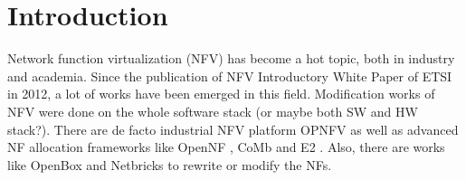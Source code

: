 \documentclass{sig-alternate-10pt}
\begin{document}
%
%



%
%

%
%



\section{Introduction}

Network function virtualization (NFV) has become a hot topic, both in industry and academia. Since the publication of NFV Introductory White Paper \cite{} of ETSI in 2012, a lot of works have been emerged in this field. Modification works of NFV were done on the whole software stack (or maybe both SW and HW stack?). There are de facto industrial NFV platform OPNFV \cite{noauthor_home_nodate} as well as advanced NF allocation frameworks like OpenNF \cite{gember-jacobson_opennf:_2014}, CoMb \cite{180672} and E2 \cite{palkar_e2:_2015}. Also, there are works like OpenBox \cite{bremler-barr_openbox:_2016} and Netbricks \cite{199352} to rewrite or modify the NFs.
\end{document}
